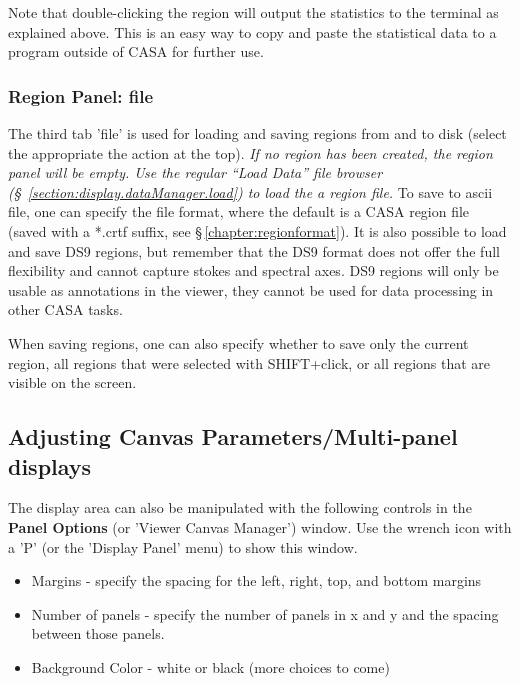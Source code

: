 Note that double-clicking the region will output the 
statistics to the terminal as explained above. This is an easy way to
copy and paste the statistical data to a program outside of CASA for
further use. 


\subsubsection{Region Panel: file}
\label{section:display.image.rgnmgr.file}

The third tab 'file' is used for loading and saving regions from and
to disk (select the appropriate the action at the top). {\it If no
  region has been created, the region panel will be empty. Use the
  regular ``Load Data'' file browser
  (\S~\ref{section:display.dataManager.load}) to load the a region file.}
To save to ascii file, one can specify the file format, where the
default is a CASA region file (saved with a *.crtf suffix, see
\S\,\ref{chapter:regionformat}). It is also possible to load and save
DS9 regions, but remember that the DS9 format does not offer the full
flexibility and cannot capture stokes and spectral axes. DS9 regions
will only be usable as annotations in the viewer, they cannot be used
for data processing in other CASA tasks.

When saving regions, one can also specify whether to save only the
current region, all regions that were selected with
SHIFT+click, or all regions that are visible on the screen. 


\subsection{Adjusting Canvas Parameters/Multi-panel displays}
\label{section:display.viewerGUI.canvas}

The display area can also be manipulated with the following controls in
the {\bf Panel Options} (or 'Viewer Canvas Manager') window.
Use the wrench icon with a 'P' (or the 'Display Panel' menu) to show this
window.
\begin{itemize}
   \item Margins - specify the spacing for the left, right, top, and bottom margins
   \item Number of panels - specify the number of panels in x and y
         and the spacing between those panels.
   \item Background Color - white or black (more choices to come)
\end{itemize}

